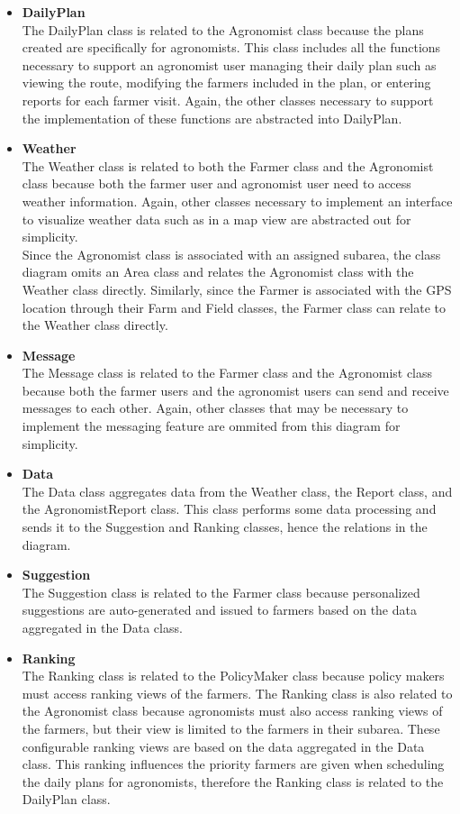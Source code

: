 \begin{itemize}
\item \textbf{DailyPlan}\\
The DailyPlan class is related to the Agronomist class because the plans created are specifically for agronomists. This class includes all the functions necessary to support an agronomist user managing their daily plan such as viewing the route, modifying the farmers included in the plan, or entering reports for each farmer visit. Again, the other classes necessary to support the implementation of these functions are abstracted into DailyPlan.

\item \textbf{Weather}\\
The Weather class is related to both the Farmer class and the Agronomist class because both the farmer user and agronomist user need to access weather information. Again, other classes necessary to implement an interface to visualize weather data such as in a map view are abstracted out for simplicity.
\smallskip\\
Since the Agronomist class is associated with an assigned subarea, the class diagram omits an Area class and relates the Agronomist class with the Weather class directly. Similarly, since the Farmer is associated with the GPS location through their Farm and Field classes, the Farmer class can relate to the Weather class directly. 

\item \textbf{Message}\\
The Message class is related to the Farmer class and the Agronomist class because both the farmer users and the agronomist users can send and receive messages to each other. Again, other classes that may be necessary to implement the messaging feature are ommited from this diagram for simplicity.

\item \textbf{Data}\\
The Data class aggregates data from the Weather class, the Report class, and the AgronomistReport class. This class performs some data processing and sends it to the Suggestion and Ranking classes, hence the relations in the diagram. 

\item \textbf{Suggestion}\\
The Suggestion class is related to the Farmer class because personalized suggestions are auto-generated and issued to farmers based on the data aggregated in the Data class.

\item \textbf{Ranking}\\
The Ranking class is related to the PolicyMaker class because policy makers must access ranking views of the farmers. The Ranking class is also related to the Agronomist class because agronomists must also access ranking views of the farmers, but their view is limited to the farmers in their subarea. These configurable ranking views are based on the data aggregated in the Data class. This ranking influences the priority farmers are given when scheduling the daily plans for agronomists, therefore the Ranking class is related to the DailyPlan class.


\end{itemize}
